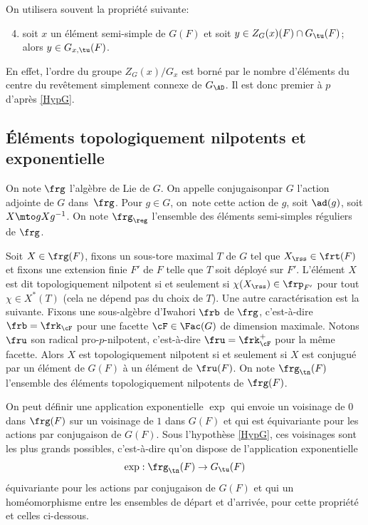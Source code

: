 On utilisera souvent la propriété suivante:

\begin{enumerate}\setcounter{enumi}{3}
\item\label{retour4}
soit $x$ un élément semi-simple de $G(F)$ et soit $y\in Z_{G}(x)(F)\cap G_{\tu}(F)$; alors $y\in G_{x,\tu}(F)$.
\end{enumerate}

En effet, l'ordre du groupe $Z_{G}(x)/G_{x}$ est borné par le nombre d'éléments du centre du revêtement simplement connexe de $G_{\AD}$. Il est donc premier à $p$ d'après \ref{HypG}.

\subsection{Éléments topologiquement nilpotents et exponentielle}\label{elementstopologiquement}
On note $\frg$ l'algèbre de Lie de $G$. On appelle \og conjugaison\fg par $G$ l'action adjointe de $G$ dans~$\frg$. Pour $g\in G$, on~note cette action de $g$, soit $\ad(g)$, soit $X\mto gXg^{-1}$. On note $\frg_{\reg}$ l'ensemble des éléments semi-simples réguliers de $\frg$.

Soit $X\in \frg(F)$, fixons un sous-tore maximal $T$ de $G$ tel que $X_{\rss}\in \frt(F)$ et fixons une extension finie $F'$ de $F$ telle que $T$ soit déployé sur $F'$. L'élément $X$ est dit topologiquement nilpotent si et seulement si $ \chi(X_{\rss})\in \frp_{F'}$ pour tout $\chi\in X^*(T)$ (cela ne dépend pas du choix de $T$). Une autre caractérisation est la suivante. Fixons une sous-algèbre d'Iwahori $\frb$ de $\frg$, c'est-à-dire $\frb=\frk_{\cF}$ pour une facette $\cF\in \Fac(G)$ de dimension maximale. Notons $\fru$ son radical pro-$p$-nilpotent, c'est-à-dire $\fru=\frk_{\cF}^+$ pour la même facette. Alors $X$ est topologiquement nilpotent si et seulement si $X$ est conjugué par un élément de $G(F)$ à un élément de $\fru(F)$. On note $\frg_{\tn}(F)$ l'ensemble des éléments topologiquement nilpotents de $\frg(F)$.

On peut définir une application exponentielle $\exp$ qui envoie un voisinage de $0$ dans $\frg(F)$ sur un voisinage de $1$ dans $G(F)$ et qui est équivariante pour les actions par conjugaison de $G(F)$. Sous l'hypothèse \ref{HypG}, ces voisinages sont les plus grands possibles, c'est-à-dire qu'on dispose de l'application exponentielle
\[
\exp:\frg_{\tn}(F)\to G_{\tu}(F)
\]
équivariante pour les actions par conjugaison de $G(F)$ et qui
un homéomorphisme entre les ensembles de départ et d'arrivée, \cf \cite[App.\,B]{DR} pour cette propriété et celles ci-dessous.

